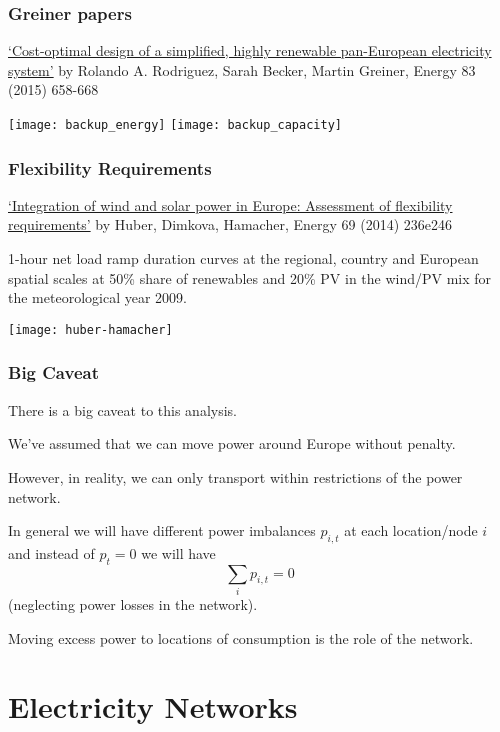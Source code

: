 \documentclass[10pt,aspectratio=169,dvipsnames]{beamer}
\begin{document}
\begin{frame}
  \frametitle{Greiner papers}


  \href{http://www.sciencedirect.com/science/article/pii/S0360544215002212}
  {`Cost-optimal design of a simplified, highly renewable pan-European
  electricity system'} by
  Rolando A. Rodriguez, Sarah Becker, Martin Greiner,
  Energy 83 (2015) 658-668

  \centering
  \texttt{[image: backup\_energy]}
  \texttt{[image: backup\_capacity]}
\end{frame}


\begin{frame}
  \frametitle{Flexibility Requirements}

  \href{http://www.sciencedirect.com/science/article/pii/S0360544214002680}{`Integration of wind and solar power in Europe: Assessment of flexibility requirements'} by Huber, Dimkova, Hamacher,
Energy 69 (2014) 236e246

  1-hour net load ramp duration curves at the regional, country and European
  spatial scales at 50\% share of renewables and 20\% PV in the wind/PV mix for the
  meteorological year 2009.

  \centering
  \texttt{[image: huber-hamacher]}


\end{frame}




\begin{frame}
  \frametitle{Big Caveat}

  There is a big caveat to this analysis.

  We've assumed that we can move power around Europe without penalty.

  However, in reality, we can only transport within restrictions of the power network.

  In general we will have different power imbalances $p_{i,t}$ at each
  location/node $i$ and instead of $p_t = 0$ we will have
  \begin{equation*}
    \sum_i p_{i,t} = 0
  \end{equation*}
  (neglecting power losses in the network).

  Moving excess power to locations of consumption is the role of the network.


\end{frame}

\section{Electricity Networks}
\end{document}
